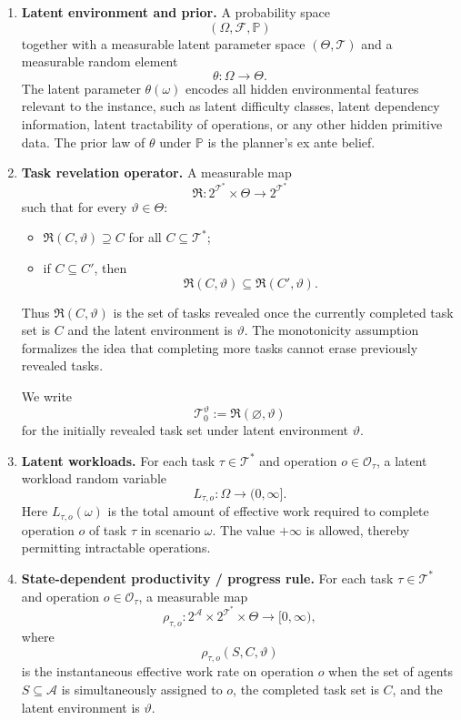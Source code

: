 \begin{definition}
\begin{enumerate}
    \item \textbf{Latent environment and prior.}  
    A probability space
    \[
    (\Omega,\mathcal F,\mathbb P)
    \]
    together with a measurable latent parameter space \((\Theta,\mathcal T)\) and a measurable random element
    \[
    \theta:\Omega\to\Theta.
    \]
    The latent parameter \(\theta(\omega)\) encodes all hidden environmental features relevant to the instance, such as latent difficulty classes, latent dependency information, latent tractability of operations, or any other hidden primitive data. The prior law of \(\theta\) under \(\mathbb P\) is the planner's ex ante belief.

    \item \textbf{Task revelation operator.}  
    A measurable map
    \[
    \mathfrak R:2^{\mathcal T^\ast}\times \Theta \to 2^{\mathcal T^\ast}
    \]
    such that for every \(\vartheta\in\Theta\):
    \begin{itemize}
        \item \(\mathfrak R(C,\vartheta)\supseteq C\) for all \(C\subseteq\mathcal T^\ast\);
        \item if \(C\subseteq C'\), then
        \[
        \mathfrak R(C,\vartheta)\subseteq \mathfrak R(C',\vartheta).
        \]
    \end{itemize}
    Thus \(\mathfrak R(C,\vartheta)\) is the set of tasks revealed once the currently completed task set is \(C\) and the latent environment is \(\vartheta\). The monotonicity assumption formalizes the idea that completing more tasks cannot erase previously revealed tasks.

    We write
    \[
    \mathcal T_0^\vartheta := \mathfrak R(\varnothing,\vartheta)
    \]
    for the initially revealed task set under latent environment \(\vartheta\).

    \item \textbf{Latent workloads.}  
    For each task \(\tau\in\mathcal T^\ast\) and operation \(o\in\mathcal O_\tau\), a latent workload random variable
    \[
    L_{\tau,o}:\Omega\to (0,\infty].
    \]
    Here \(L_{\tau,o}(\omega)\) is the total amount of effective work required to complete operation \(o\) of task \(\tau\) in scenario \(\omega\). The value \(+\infty\) is allowed, thereby permitting intractable operations.

    \item \textbf{State-dependent productivity / progress rule.}  
    For each task \(\tau\in\mathcal T^\ast\) and operation \(o\in\mathcal O_\tau\), a measurable map
    \[
    \rho_{\tau,o}:2^{\mathcal A}\times 2^{\mathcal T^\ast}\times \Theta \to [0,\infty),
    \]
    where
    \[
    \rho_{\tau,o}(S,C,\vartheta)
    \]
    is the instantaneous effective work rate on operation \(o\) when the set of agents \(S\subseteq \mathcal A\) is simultaneously assigned to \(o\), the completed task set is \(C\), and the latent environment is \(\vartheta\).


\end{enumerate}
\end{definition}
